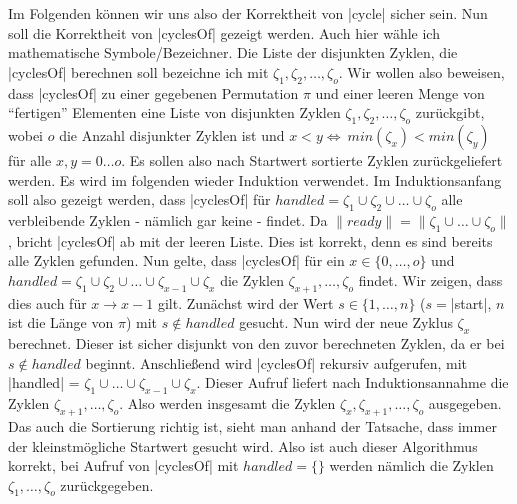 Im Folgenden können wir uns also der Korrektheit von |cycle| sicher sein. Nun soll die Korrektheit von |cyclesOf| gezeigt werden.
Auch hier wähle ich mathematische Symbole/Bezeichner. Die Liste der disjunkten Zyklen, die |cyclesOf| berechnen soll bezeichne ich mit $\zeta_1, \zeta_2, \dots, \zeta_o$.
Wir wollen also beweisen, dass |cyclesOf| zu einer gegebenen Permutation $\pi$ und einer leeren Menge von ``fertigen'' Elementen eine Liste
von disjunkten Zyklen $\zeta_1, \zeta_2, \dots, \zeta_o$ zurückgibt, wobei $o$ die Anzahl disjunkter Zyklen ist und $x < y \Leftrightarrow \ min(\zeta_x) < min(\zeta_y)$ für alle $x,y=0 \dots o$.
Es sollen also nach Startwert sortierte Zyklen zurückgeliefert werden.
Es wird im folgenden wieder Induktion verwendet.
Im Induktionsanfang soll also gezeigt werden, dass |cyclesOf| für $handled = \zeta_1 \cup \zeta_2 \cup \dots \cup \zeta_o$ alle verbleibende Zyklen - nämlich gar keine - findet.
Da $\|ready\| = \|\zeta_1 \cup \dots \cup \zeta_o\|$, bricht |cyclesOf| ab mit der leeren Liste. Dies ist korrekt, denn es sind bereits alle Zyklen gefunden.
Nun gelte, dass |cyclesOf| für ein $x \in \{0, \dots, o\}$ und $handled = \zeta_1 \cup \zeta_2 \cup \dots \cup \zeta_{x-1} \cup \zeta_x$ die Zyklen $\zeta_{x+1}, \dots, \zeta_o$ findet.
Wir zeigen, dass dies auch für $x \rightarrow x-1$ gilt.
Zunächst wird der Wert $s \in \{1, \dots, n\}$ ($s=$|start|, $n$ ist die Länge von $\pi$) mit $s \notin handled$ gesucht.
Nun wird der neue Zyklus $\zeta_x$ berechnet. Dieser ist sicher disjunkt von den zuvor berechneten Zyklen, da er bei $s \notin handled$ beginnt.
Anschließend wird |cyclesOf| rekursiv aufgerufen, mit |handled| = $\zeta_1 \cup \dots \cup \zeta_{x-1} \cup \zeta_{x}$.
Dieser Aufruf liefert nach Induktionsannahme die Zyklen $\zeta_{x+1}, \dots, \zeta_o$.
Also werden insgesamt die Zyklen $\zeta_{x}, \zeta_{x+1}, \dots, \zeta_o$ ausgegeben.
Das auch die Sortierung richtig ist, sieht man anhand der Tatsache, dass immer der kleinstmögliche Startwert gesucht wird.
Also ist auch dieser Algorithmus korrekt, bei Aufruf von |cyclesOf| mit $handled = \{\}$ werden nämlich die Zyklen $\zeta_1, \dots, \zeta_o$ zurückgegeben.\\

